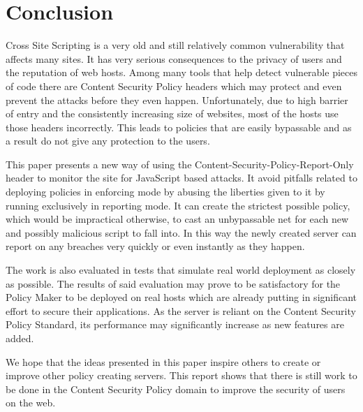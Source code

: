 \chapter{Conclusion}

Cross Site Scripting is a very old and still relatively common vulnerability that affects many sites.
It has very serious consequences to the privacy of users and the reputation of web hosts.
Among many tools that help detect vulnerable pieces of code there are Content Security Policy headers which may protect and even prevent the attacks before they even happen.
Unfortunately, due to high barrier of entry and the consistently increasing size of websites, most of the hosts use those headers incorrectly.
This leads to policies that are easily bypassable and as a result do not give any protection to the users.

This paper presents a new way of using the Content-Security-Policy-Report-Only header to monitor the site for JavaScript based attacks.
It avoid pitfalls related to deploying policies in enforcing mode by abusing the liberties given to it by running exclusively in reporting mode.
It can create the strictest possible policy, which would be impractical otherwise, to cast an unbypassable net for each new and possibly malicious script to fall into.
In this way the newly created server can report on any breaches very quickly or even instantly as they happen.

The work is also evaluated in tests that simulate real world deployment as closely as possible.
The results of said evaluation may prove to be satisfactory for the Policy Maker to be deployed on real hosts which are already putting in significant effort to secure their applications.
As the server is reliant on the Content Security Policy Standard, its performance may significantly increase as new features are added.

We hope that the ideas presented in this paper inspire others to create or improve other policy creating servers.
This report shows that there is still work to be done in the Content Security Policy domain to improve the security of users on the web.
